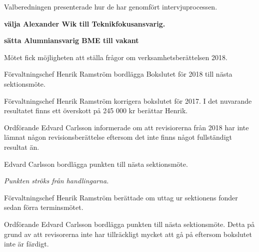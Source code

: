 \documentclass[10pt]{article}
\begin{document}
\begin{paragrafer}
Valberedningen presenterade hur de har genomfört intervjuprocessen.

\textbf{\Mba välja Alexander Wik till Teknikfokusansvarig.}\par

\textbf{\Mba sätta Alumniansvarig BME till vakant}

Mötet fick möjligheten att ställa frågor om verksamhetsberättelsen 2018.

Förvaltningschef Henrik Ramström \ypa bordlägga Bokslutet för 2018 till nästa sektionsmöte.

\Mbaby

Förvaltningschef Henrik Ramström \ypa korrigera bokslutet för 2017. I det nuvarande resultatet finns ett överskott på 245 000 kr berättar Henrik. 

\Mbaby

Ordförande Edvard Carlsson informerade om att revisiorerna från 2018 har inte lämnat någon revisionsberättelse eftersom det inte finns något fullständigt resultat än.

Edvard Carlsson \ypa bordlägga punkten till nästa sektionsmöte.

\Mbaby


\textit{Punkten ströks från handlingarna.}

Förvaltningschef Henrik Ramström berättade om uttag ur sektionens fonder sedan förra terminsmötet.




  Ordförande Edvard Carlsson \ypa bordlägga punkten till nästa sektionsmöte. Detta på grund av att revisorerna inte har 
    tillräckligt mycket att gå på eftersom bokslutet inte är färdigt.


\end{paragrafer}
\end{document}
